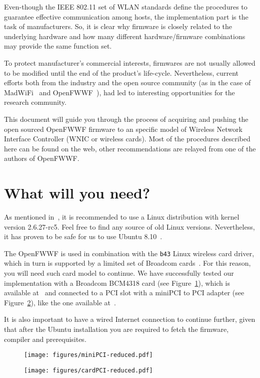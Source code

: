\documentclass[conference]{IEEEtran}
\begin{document}
Even-though the IEEE 802.11 set of WLAN standards define the procedures to guarantee effective communication among hosts, the implementation part is the task of manufacturers. So, it is clear why firmware is closely related to the underlying hardware and how many different hardware/firmware combinations may provide the same function set.

To protect manufacturer's commercial interests, firmwares are not usually allowed to be modified until the end of the product's life-cycle. Nevertheless, current efforts both from the industry and the open source community (as in the case of MadWiFi~\cite{madWiFi} and OpenFWWF~\cite{OpenFWWF}), had led to interesting opportunities for the research community.

This document will guide you through the process of acquiring and pushing the open sourced OpenFWWF firmware to an specific model of Wireless Network Interface Controller (WNIC or wireless cards). Most of the procedures described here can be found on the web, other recommendations are relayed from one of the authors of OpenFWWF.

\section{What will you need?}\label{hardware}
As mentioned in~\cite{OpenFWWF}, it is recommended to use a Linux distribution with kernel version 2.6.27-rc5. Feel free to find any source of old Linux versions. Nevertheless, it has proven to be safe for us to use Ubuntu 8.10~\cite{ubuntu8}.

The OpenFWWF is used in combination with the \texttt{b43} Linux  wireless card driver, which in turn is supported by a limited set of Broadcom cards~\cite{b43-info}. For this reason, you will need such card model to continue. We have successfully tested our implementation with a Broadcom BCM4318 card (see Figure~\ref{fig:miniPCI}), which is available at~\cite{bcm4318} and connected to a PCI slot with a miniPCI to PCI adapter (see Figure~\ref{fig:PCI}), like the one available at~\cite{PCIAdapter}.

It is also important to have a wired Internet connection to continue further, given that after the Ubuntu installation you are required to fetch the firmware, compiler and prerequisites.

\begin{figure*}[t]
\centering
\begin{subfigure}{.5\textwidth}
  \centering
  \texttt{[image: figures/miniPCI-reduced.pdf]}
  \caption{}
  \label{fig:miniPCI}
\end{subfigure}%
\begin{subfigure}{.5\textwidth}
  \centering
  \texttt{[image: figures/cardPCI-reduced.pdf]}
  \caption{}
  \label{fig:PCI}
\end{subfigure}
\caption{\ref{fig:miniPCI}) Broadcom BCM418 miniPCI. \ref{fig:PCI}) Card correctly placed into the PCI adapter.}
\label{installedCard}
\end{figure*}
\end{document}
